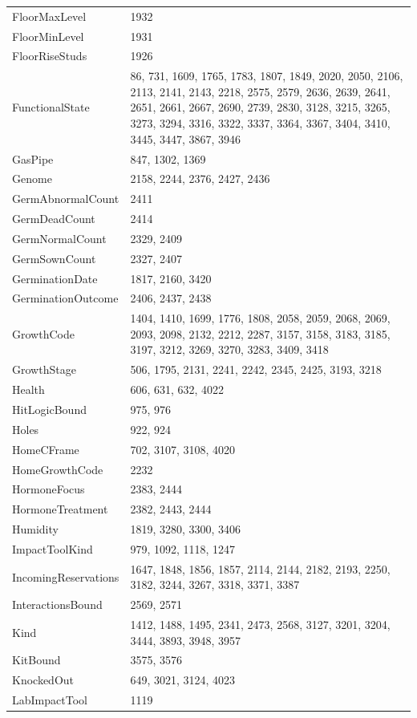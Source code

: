 \begin{longtable}{p{}p{}}
FloorMaxLevel & 1932 \\
FloorMinLevel & 1931 \\
FloorRiseStuds & 1926 \\
FunctionalState & 86, 731, 1609, 1765, 1783, 1807, 1849, 2020, 2050, 2106, 2113, 2141, 2143, 2218, 2575, 2579, 2636, 2639, 2641, 2651, 2661, 2667, 2690, 2739, 2830, 3128, 3215, 3265, 3273, 3294, 3316, 3322, 3337, 3364, 3367, 3404, 3410, 3445, 3447, 3867, 3946 \\
GasPipe & 847, 1302, 1369 \\
Genome & 2158, 2244, 2376, 2427, 2436 \\
GermAbnormalCount & 2411 \\
GermDeadCount & 2414 \\
GermNormalCount & 2329, 2409 \\
GermSownCount & 2327, 2407 \\
GerminationDate & 1817, 2160, 3420 \\
GerminationOutcome & 2406, 2437, 2438 \\
GrowthCode & 1404, 1410, 1699, 1776, 1808, 2058, 2059, 2068, 2069, 2093, 2098, 2132, 2212, 2287, 3157, 3158, 3183, 3185, 3197, 3212, 3269, 3270, 3283, 3409, 3418 \\
GrowthStage & 506, 1795, 2131, 2241, 2242, 2345, 2425, 3193, 3218 \\
Health & 606, 631, 632, 4022 \\
HitLogicBound & 975, 976 \\
Holes & 922, 924 \\
HomeCFrame & 702, 3107, 3108, 4020 \\
HomeGrowthCode & 2232 \\
HormoneFocus & 2383, 2444 \\
HormoneTreatment & 2382, 2443, 2444 \\
Humidity & 1819, 3280, 3300, 3406 \\
ImpactToolKind & 979, 1092, 1118, 1247 \\
IncomingReservations & 1647, 1848, 1856, 1857, 2114, 2144, 2182, 2193, 2250, 3182, 3244, 3267, 3318, 3371, 3387 \\
InteractionsBound & 2569, 2571 \\
Kind & 1412, 1488, 1495, 2341, 2473, 2568, 3127, 3201, 3204, 3444, 3893, 3948, 3957 \\
KitBound & 3575, 3576 \\
KnockedOut & 649, 3021, 3124, 4023 \\
LabImpactTool & 1119 \\

\end{longtable}
